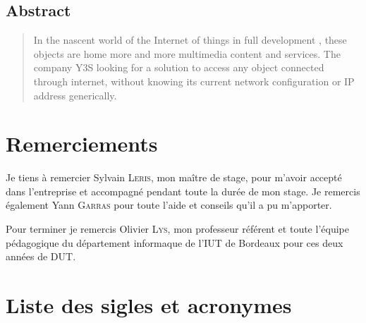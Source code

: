 \documentclass[a4paper,12pt]{book}
\theoremstyle{break}
\begin{document}
\begin{otherlanguage}{english}
  \chapter{Abstract}
  \begin{quotation}
	In the nascent world of the Internet of things in full development , these objects are home more and more multimedia content and services. The company Y3S looking for a solution to access any object connected through internet, without knowing its current network configuration or IP address generically.
  \end{quotation}
\end{otherlanguage}

\chapter{Remerciements}
Je tiens à remercier Sylvain \textsc{Leris}, mon maître de stage, pour m'avoir accepté dans l'entreprise et accompagné pendant toute la durée de mon stage. Je remercis également Yann \textsc{Garras} pour toute l'aide et conseils qu'il a pu m'apporter.

Pour terminer je remercis Olivier \textsc{Lys}, mon professeur référent et toute l'équipe pédagogique du département informaque de l'IUT de Bordeaux pour ces deux années de DUT.

\tableofcontents

\listoffigures

\chapter{Liste des sigles et acronymes}
\begin{acronym}[CP-OFDMX] %
\end{acronym}
\end{document}
